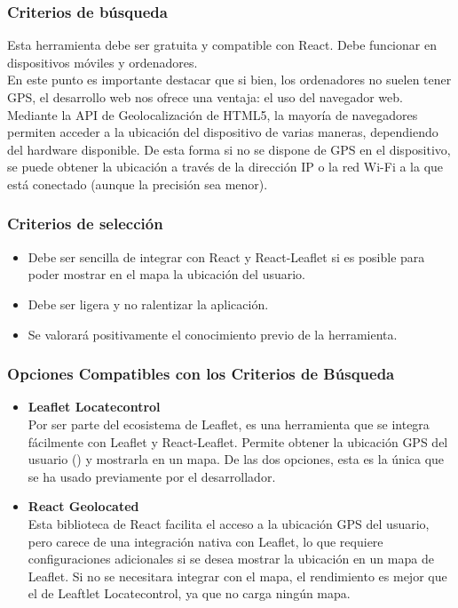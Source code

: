 \subsubsection{Criterios de búsqueda}
Esta herramienta debe ser gratuita y compatible con React. Debe funcionar en dispositivos móviles y ordenadores. \\

En este punto es importante destacar que si bien, los ordenadores no suelen tener GPS, el desarrollo web nos ofrece una ventaja: el uso del navegador web. Mediante la API de Geolocalización de HTML5, la mayoría de navegadores permiten acceder a la ubicación del dispositivo de varias maneras, dependiendo del hardware disponible. De esta forma si no se dispone de GPS en el dispositivo, se puede obtener la ubicación a través de la dirección IP o la red Wi-Fi a la que está conectado (aunque la precisión sea menor).

\subsubsection{Criterios de selección}
\begin{itemize}
    \item Debe ser sencilla de integrar con React y React-Leaflet si es posible para poder mostrar en el mapa la ubicación del usuario.
    \item Debe ser ligera y no ralentizar la aplicación.
    \item Se valorará positivamente el conocimiento previo de la herramienta. 
\end{itemize}

\subsubsection{Opciones Compatibles con los Criterios de Búsqueda} 
\begin{itemize} 
    \item \textbf{Leaflet Locatecontrol}\\
    Por ser parte del ecosistema de Leaflet, es una herramienta que se integra fácilmente con Leaflet y React-Leaflet. Permite obtener la ubicación GPS del usuario () y mostrarla en un mapa. De las dos opciones, esta es la única que se ha usado previamente por el desarrollador.
    \item \textbf{React Geolocated}\\
    Esta biblioteca de React facilita el acceso a la ubicación GPS del usuario, pero carece de una integración nativa con Leaflet, lo que requiere configuraciones adicionales si se desea mostrar la ubicación en un mapa de Leaflet. Si no se necesitara integrar con el mapa, el rendimiento es mejor que el de Leaftlet Locatecontrol, ya que no carga ningún mapa.
\end{itemize}

